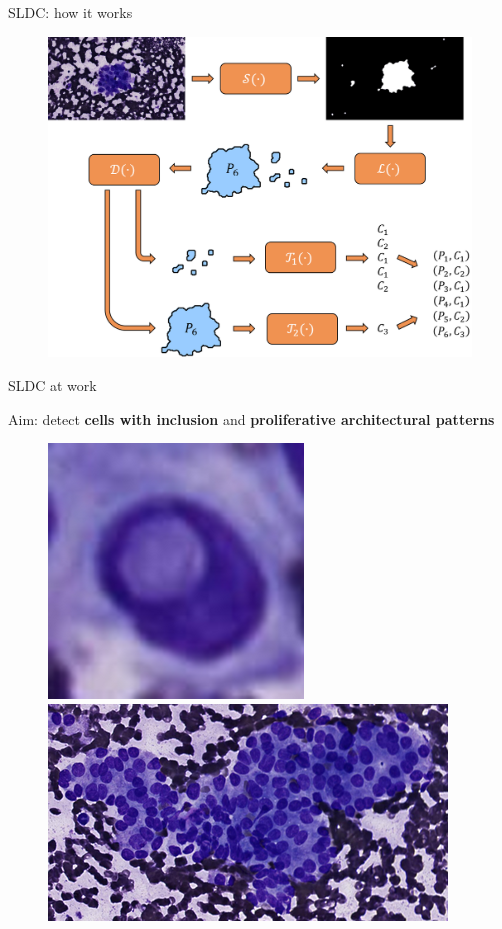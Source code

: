 \documentclass{beamer}
\begin{document}
\begin{frame}{SLDC: how it works}
	\begin{figure}
		\includegraphics[scale=0.45]{images/workflow_illustration.png}
	\end{figure}
\end{frame}


\begin{frame}{SLDC at work}
	\begin{center}	
		Aim: detect \textbf{cells with inclusion} and \textbf{proliferative architectural patterns}
	\end{center}
	\begin{figure}
		\includegraphics[scale=0.35]{images/incl1.png}
		\hspace{1cm}
		\includegraphics[scale=0.55]{images/prolif_pattern_1.png}
	\end{figure}
\end{frame}
\end{document}
